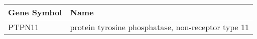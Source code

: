 \begin{tabular}{ll}
\toprule
Gene Symbol &                                               Name \\
\midrule
     PTPN11 & protein tyrosine phosphatase, non-receptor type 11 \\
\bottomrule
\end{tabular}
